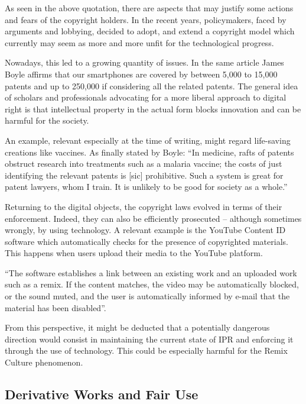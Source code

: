 As seen in the above quotation, there are aspects that may justify some actions and fears of the copyright holders. In the recent years, policymakers, faced by arguments and lobbying, decided to adopt, and extend a copyright model which currently may seem as more and more unfit for the technological progress.

Nowadays, this led to a growing quantity of issues. In the same article James Boyle affirms that our smartphones are covered by between 5,000 to 15,000 patents and up to 250,000 if considering all the related patents. The general idea of scholars and professionals advocating for a more liberal approach to digital right is that intellectual property in the actual form blocks innovation and can be harmful for the society.

An example, relevant especially at the time of writing, might regard life-saving creations like vaccines. As finally stated by Boyle: “In medicine, rafts of patents obstruct research into treatments such as a malaria vaccine; the costs of just identifying the relevant patents is [sic] prohibitive. Such a system is great for patent lawyers, whom I train. It is unlikely to be good for society as a whole.”\,

Returning to the digital objects, the copyright laws evolved in terms of their enforcement. Indeed, they can also be efficiently prosecuted – although sometimes wrongly, by using technology. A relevant example is the YouTube Content ID software which automatically checks for the presence of copyrighted materials. This happens when users upload their media to the YouTube platform.

\begin{displayquote}
“The software establishes a link between an existing work and an uploaded work such as a remix. If the content matches, the video may be automatically blocked, or the sound muted, and the user is automatically informed by e-mail that the material has been disabled”.
\end{displayquote}

From this perspective, it might be deducted that a potentially dangerous direction would consist in maintaining the current state of IPR and enforcing it through the use of technology. This could be especially harmful for the Remix Culture phenomenon.

\subsection{Derivative Works and Fair Use}

